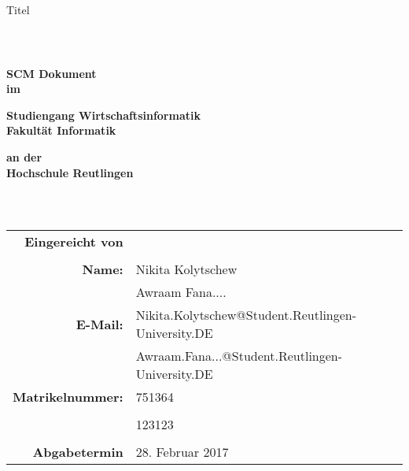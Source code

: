 \thispagestyle{empty}


\begin{figure}[t]
  \centering
\end{figure}

\begin{verbatim}


\end{verbatim}

\begin{center}
  \Large{Titel}
\end{center}

\begin{verbatim}



\end{verbatim}

\begin{center}
  \doublespacing
  \textbf{\LARGE{SCM Dokument}} \\
  \textbf{\small{im}}

  \singlespacing
  \textbf{Studiengang Wirtschaftsinformatik} \\
  \textbf{Fakultät Informatik}

  \doublespacing
  \textbf{\small{an der}} \\
  \textbf{Hochschule Reutlingen}
\end{center}

\begin{verbatim}



\end{verbatim}

\begin{center}
  \begin{tabular}{rll}
    \textbf{Eingereicht von} & & \\ \\
    \textbf{Name:} & Nikita Kolytschew & \\
							     & Awraam Fana.... & \\
    \textbf{E-Mail:} & Nikita.Kolytschew@Student.Reutlingen-University.DE & \\
								     & Awraam.Fana...@Student.Reutlingen-University.DE & \\
    \textbf{Matrikelnummer:} & 751364 & \\ \\
														 & 123123 & \\ \\
    
	  \textbf{Abgabetermin} & 28. Februar 2017 & \\
  \end{tabular}
\end{center}